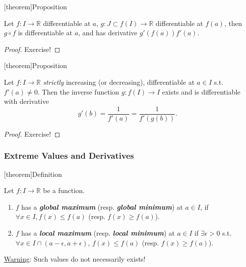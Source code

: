 \documentclass[12pt]{report}
\theoremstyle{definition}
\begin{document}
[theorem]{Proposition}
\begin{chain rule}
    Let $f:I\rightarrow{}\mathbb{R}$ differentiable at $a$, 
    $g:J\subset f(I) \rightarrow{}\mathbb{R}$ differentiable at $f(a)$,
    then $g\circ f$ is differentiable at $a$, and has derivative $g'(f(a))f'(a)$.
\end{chain rule}

\begin{proof}
    Exercise!
\end{proof}

[theorem]{Proposition}
\begin{inverse function differentiation}
    Let $f:I\rightarrow{}\mathbb{R}$ \emph{strictly} increasing (or decreasing),
    differentiable at $a\in I$ s.t. $f'(a) \neq 0$.
    Then the inverse function $g:f(I)\rightarrow{}I$ exists and is differentiable with derivative\[
        g'(b) = \frac{1}{f'(a)} = \frac{1}{f'(g(b))}.
    \]
\end{inverse function differentiation}

\begin{proof}
    Exercise!
\end{proof}

\subsubsection{Extreme Values and Derivatives}

[theorem]{Definition}
\begin{global/local maximum/minimum}
    Let $f:I\rightarrow{}\mathbb{R}$ be a function.
    \begin{enumerate}[label = (\arabic*)]
        \item $f$ has a \textbf{\emph{global maximum}} (resp. \textbf{\emph{global minimum}})
            at $a\in I$, if $\forall x \in I, f(x) \le f(a)$ (resp. $f(x) \ge f(a)$).
        \item $f$ has a \textbf{\emph{local maximum}} (resp. \textbf{\emph{local minimum}})
            at $a\in I$ if $\exists \epsilon > 0$ s.t. $\forall x \in I \cap (a-\epsilon, a+\epsilon)$,
            $f(x) \le f(a)$ (resp. $f(x) \ge f(a)$).
    \end{enumerate}
\end{global/local maximum/minimum}

\underline{Warning}: Such values do not necessarily exists!
\end{document}
